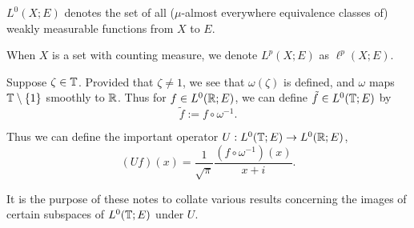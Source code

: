 $L^0(X;E)$ denotes the set of all ($\mu$-almost everywhere equivalence classes of)
weakly measurable functions from $X$ to $E$.

When $X$ is a set with counting measure, we denote $L^p(X;E)$ as $\ell^p(X;E)$.

Suppose $\zeta \in \mathbb{T}$. Provided that $\zeta \neq 1$, we see that $\omega(\zeta)$
is defined, and $\omega$ maps $\mathbb{T}\setminus\{1\}$ smoothly to $\mathbb{R}$. Thus for
$f \in L^0(\mathbb{R};E)$, we can define $\tilde{f} \in L^0(\mathbb{T};E)$
by 
\begin{equation*}
    \tilde{f} := f\circ \omega^{-1}.
\end{equation*}

Thus we can define the important operator $U:L^0(\mathbb{T};E)\rightarrow L^0(\mathbb{R};E)$,
\begin{equation*}
    (U f)(x) = \frac{1}{\sqrt{\pi}}\frac{(f\circ \omega^{-1})(x)}{x+i}.
\end{equation*}

It is the purpose of these notes to collate various results concerning the images
of certain subspaces of $L^0(\mathbb{T};E)$ under $U$.

